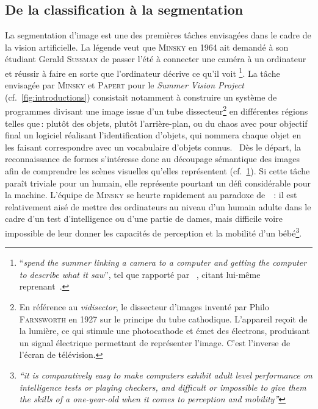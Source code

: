 \subsection{De la classification à la segmentation}

\begin{figure}[t]
  \resizebox{\textwidth}{!}{}
  \label{fig:classif_vs_seg}
\end{figure}

La segmentation d'image est une des premières tâches envisagées dans le cadre de la vision artificielle.
La légende veut que \textsc{Minsky} en 1964 ait demandé à son étudiant Gerald \textsc{Sussman} de \og passer l'été à connecter une caméra à un ordinateur et réussir à faire en sorte que l'ordinateur décrive ce qu'il voit \fg\footnote{``\emph{spend the summer linking a camera to a computer and getting the computer to describe what it saw}'', tel que rapporté par ~\citet{szeliski_computer_2011}, citant lui-même~\citet{boden_mind_2008} reprenant~\citet{crevier_ai_1993}.}.
La tâche envisagée par \textsc{Minsky} et \textsc{Papert} pour le \emph{Summer Vision Project} (cf.~\cref{fig:introductions}) consistait notamment à \og construire un système de programmes divisant une image issue d'un tube dissecteur\footnote{En référence au \emph{vidisector}, le dissecteur d'images inventé par Philo \textsc{Farnsworth} en 1927 sur le principe du tube cathodique. L'appareil reçoit de la lumière, ce qui stimule une photocathode et émet des électrons, produisant un signal électrique permettant de représenter l'image. C'est l'inverse de l'écran de télévision.} en différentes régions telles que\,: plutôt des objets, plutôt l'arrière-plan, ou du chaos\fg{} avec pour objectif final un logiciel réalisant \og l'identification d'objets, qui nommera chaque objet en les faisant correspondre avec un vocabulaire d'objets connus.\fg{}~\cite{papert_summer_1966}
Dès le départ, la reconnaissance de formes s'intéresse donc au découpage sémantique des images afin de comprendre les scènes visuelles qu'elles représentent (cf.~\cref{fig:classif_vs_seg}).
Si cette tâche paraît triviale pour un humain, elle représente pourtant un défi considérable pour la machine. L'équipe de \textsc{Minsky} se heurte rapidement au paradoxe de ~\citet{moravec_mind_1988}\,: \og il est relativement aisé de mettre des ordinateurs au niveau d'un humain adulte dans le cadre d'un test d'intelligence ou d'une partie de dames, mais difficile voire impossible de leur donner les capacités de perception et la mobilité d'un bébé\fg{}\footnote{\emph{``it is comparatively easy to make computers exhibit adult level performance on intelligence tests or playing checkers, and difficult or impossible to give them the skills of a one-year-old when it comes to perception and mobility''}}.

